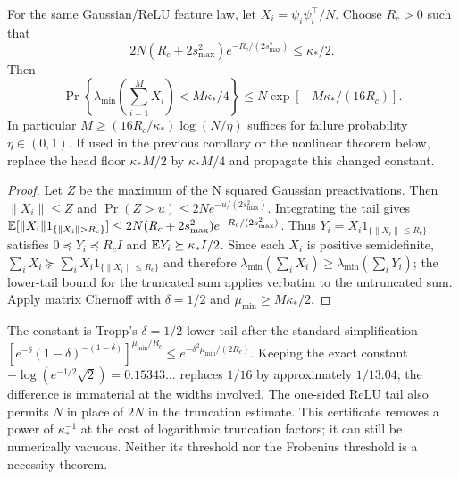 \begin{proposition}
\label{prop:astra_chernoff}
For the same Gaussian/ReLU feature law, let $X_i=\psi_i\psi_i^\top/N$.
Choose $R_c>0$ such that
\[
 2N(R_c+2s_{\max}^2)e^{-R_c/(2s_{\max}^2)}\le\kappa_*/2.
\]
Then
\begin{equation}\label{eq:astra_chernoff}
 \Pr\left\{\lambda_{\min}\left(\sum_{i=1}^M X_i\right)
               <M\kappa_*/4\right\}
 \le N\exp[-M\kappa_*/(16R_c)].
\end{equation}
In particular $M\ge(16R_c/\kappa_*)\log(N/\eta)$ suffices for failure
probability $\eta\in(0,1)$. If used in the previous corollary or the
nonlinear theorem below, replace the head floor $\kappa_*M/2$ by
$\kappa_*M/4$ and propagate this changed constant.
\end{proposition}
\begin{proof}
Let $Z$ be the maximum of the N squared Gaussian preactivations.
Then $\|X_i\|\le Z$ and $\Pr(Z>u)\le2N e^{-u/(2s_{\max}^2)}$.
Integrating the tail gives
$\E[\|X_i\|1_{\{\|X_i\|>R_c\}}]
\le2N(R_c+2s_{\max}^2)e^{-R_c/(2s_{\max}^2)}$.
Thus $Y_i=X_i1_{\{\|X_i\|\le R_c\}}$ satisfies
$0\preceq Y_i\preceq R_cI$ and $\mathbb{E} Y_i\succeq\kappa_*I/2$.
Since each $X_i$ is positive semidefinite,
$\sum_iX_i\succeq\sum_iX_i1_{\{\|X_i\|\le R_c\}}$ and therefore
$\lambda_{\min}(\sum_iX_i)\ge\lambda_{\min}(\sum_iY_i)$; the
lower-tail bound for the truncated sum applies verbatim to the
untruncated sum. Apply matrix Chernoff \citep{astra_tropp2012} with
$\delta=1/2$ and $\mu_{\min}\ge M\kappa_*/2$.
\end{proof}
\begin{remark}
The constant is Tropp's $\delta=1/2$ lower tail after the standard
simplification
$[e^{-\delta}(1-\delta)^{-(1-\delta)}]^{\mu_{\min}/R_c}
\le e^{-\delta^2\mu_{\min}/(2R_c)}$.
Keeping the exact constant $-\log(e^{-1/2}\sqrt2)=0.15343\ldots$
replaces $1/16$ by approximately $1/13.04$; the difference is immaterial
at the widths involved. The one-sided ReLU tail also permits $N$ in
place of $2N$ in the truncation estimate. This certificate removes a
power of $\kappa_*^{-1}$ at the cost of logarithmic truncation factors;
it can still be numerically vacuous. Neither its threshold nor the
Frobenius threshold is a necessity theorem.
\end{remark}


